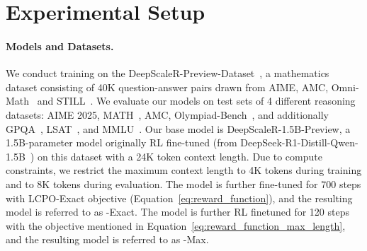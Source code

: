 \section{Experimental Setup}
\label{sec:experimental-setup}

\paragraph{Models and Datasets.}
We conduct training on the DeepScaleR-Preview-Dataset~\citep{deepscaler2025}, a mathematics dataset consisting of 40K question-answer pairs drawn from AIME, AMC, Omni-Math~\citep{gao2024omnimathuniversalolympiadlevel} and STILL~\citep{min2024imitateexploreselfimprovereproduction}. 
We evaluate our models on test sets of 4 different reasoning datasets: AIME 2025, MATH~\citep{hendrycks2021measuringmathematicalproblemsolving}, AMC, Olympiad-Bench~\citep{he2024olympiadbenchchallengingbenchmarkpromoting}, and additionally GPQA~\citep{rein2023gpqagraduatelevelgoogleproofqa}, LSAT~\citep{zhong2023agievalhumancentricbenchmarkevaluating}, and MMLU~\citep{hendrycks2021measuringmassivemultitasklanguage}. 
Our base model is DeepScaleR-1.5B-Preview, a 1.5B-parameter model originally RL fine-tuned (from DeepSeek-R1-Distill-Qwen-1.5B~\citep{deepseekai2025deepseekr1incentivizingreasoningcapability}) on this dataset with a 24K token context length. Due to compute constraints, we restrict the maximum context length to 4K tokens during training and to 8K tokens during evaluation. The model is further fine-tuned for 700 steps with LCPO-Exact objective (Equation~\ref{eq:reward_function}), and the resulting model is referred to as \model{}-Exact. The model is further RL finetuned for 120 steps with the objective mentioned in Equation~\ref{eq:reward_function_max_length}, and the resulting model is referred to as \model{}-Max.

